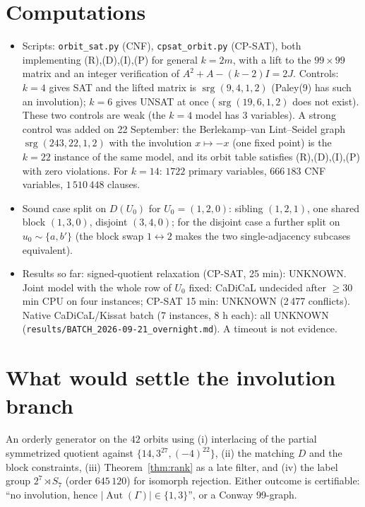 \documentclass[11pt,a4paper]{article}
\theoremstyle{remark}
\newcommand{\srg}{\operatorname{srg}}
\begin{document}
\section{Computations}
\begin{itemize}[nosep]
\item Scripts: \texttt{orbit\_sat.py} (CNF), \texttt{cpsat\_orbit.py} (CP-SAT), both implementing (R),(D),(I),(P) for general $k=2m$, with a lift to the $99\times99$
matrix and an integer verification of $A^2+A-(k-2)I=2J$. Controls: $k=4$ gives SAT and the lifted matrix is $\srg(9,4,1,2)$ (Paley(9) has such an involution);
$k=6$ gives UNSAT at once ($\srg(19,6,1,2)$ does not exist). These two controls are weak (the $k=4$ model has 3 variables). A strong control was added on 22 September:
the Berlekamp--van Lint--Seidel graph $\srg(243,22,1,2)$ \cite{BvLS} with the involution $x\mapsto-x$ (one fixed point) is the $k=22$ instance of the same model, and its orbit table
satisfies (R),(D),(I),(P) with zero violations. For $k=14$: $1722$ primary variables, $666\,183$ CNF variables, $1\,510\,448$ clauses.
\item Sound case split on $D(U_0)$ for $U_0=(1,2,0)$: sibling $(1,2,1)$, one shared block $(1,3,0)$, disjoint $(3,4,0)$; for the disjoint case a further
split on $u_0\sim\{a,b'\}$ (the block swap $1\leftrightarrow2$ makes the two single-adjacency subcases equivalent).
\item Results so far: signed-quotient relaxation (CP-SAT, 25 min): UNKNOWN. Joint model with the whole row of $U_0$ fixed: CaDiCaL undecided after $\ge30$ min CPU
on four instances; CP-SAT 15 min: UNKNOWN (2\,477 conflicts). Native CaDiCaL/Kissat batch (7 instances, 8 h each): all UNKNOWN (\texttt{results/BATCH\_2026-09-21\_overnight.md}).
A timeout is not evidence.
\end{itemize}

\section{What would settle the involution branch}
An orderly generator on the $42$ orbits using (i) interlacing of the partial symmetrized quotient against $\{14,3^{27},(-4)^{22}\}$, (ii) the matching $D$ and the block
constraints, (iii) Theorem~\ref{thm:rank} as a late filter, and (iv) the label group $2^7\rtimes S_7$ (order $645\,120$) for isomorph rejection.
Either outcome is certifiable: ``no involution, hence $|\!\operatorname{Aut}(\Gamma)|\in\{1,3\}$'', or a Conway 99-graph.
\end{document}
